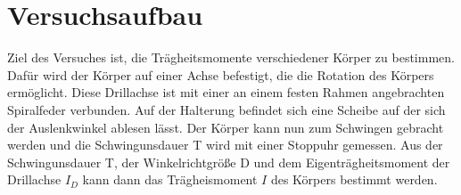 \section{Versuchsaufbau}
\label{sec:Versuchsaufbau}
Ziel des Versuches ist, die Trägheitsmomente verschiedener Körper zu bestimmen. 
Dafür wird der Körper auf einer Achse befestigt, die die Rotation des Körpers ermöglicht.
Diese Drillachse ist mit einer an einem festen Rahmen angebrachten Spiralfeder verbunden.
Auf der Halterung befindet sich eine Scheibe auf der sich der Auslenkwinkel ablesen lässt.
Der Körper kann nun zum Schwingen gebracht werden und die Schwingunsdauer T wird mit einer Stoppuhr gemessen.
Aus der Schwingunsdauer T, der Winkelrichtgröße D und dem Eigenträgheitsmoment der Drillachse $I_D$  
kann dann das Trägheismoment $I$ des Körpers bestimmt werden. 